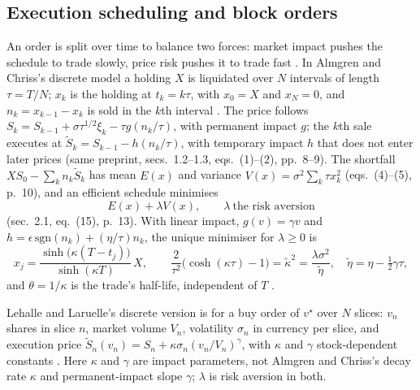\subsection{Execution scheduling and block orders}

\begin{qfmodel}\label{mod:almgren-chriss-execution}
 An order is split over time to balance two forces: market impact pushes the schedule to trade slowly, price risk pushes it to trade fast \citep[app.~A, sec.~A.7, p.~274]{alpha-laruelle}. In Almgren and Chriss's discrete model a holding $X$ is liquidated over $N$ intervals of length $\tau=T/N$; $x_k$ is the holding at $t_k=k\tau$, with $x_0=X$ and $x_N=0$, and $n_k=x_{k-1}-x_k$ is sold in the $k$th interval \citep[author preprint of Dec.\ 2000, sec.~1.1, p.~7]{alpha-almgren}. The price follows $S_k=S_{k-1}+\sigma\tau^{1/2}\xi_k-\tau g(n_k/\tau)$, with permanent impact $g$; the $k$th sale executes at $\tilde S_k=S_{k-1}-h(n_k/\tau)$, with temporary impact $h$ that does not enter later prices (same preprint, secs.~1.2--1.3, eqs.~(1)--(2), pp.~8--9). The shortfall $XS_0-\sum_kn_k\tilde S_k$ has mean $E(x)$ and variance $V(x)=\sigma^2\sum_k\tau x_k^2$ (eqs.~(4)--(5), p.~10), and an efficient schedule minimises
\[ E(x)+\lambda V(x),\qquad \lambda\ \text{the risk aversion} \]
(sec.~2.1, eq.~(15), p.~13). With linear impact, $g(v)=\gamma v$ and $h=\epsilon\,\mathrm{sgn}(n_k)+(\eta/\tau)n_k$, the unique minimiser for $\lambda\ge0$ is
\[ x_j=\frac{\sinh\bigl(\kappa(T-t_j)\bigr)}{\sinh(\kappa T)}\,X,\qquad \frac2{\tau^2}\bigl(\cosh(\kappa\tau)-1\bigr)=\tilde\kappa^2=\frac{\lambda\sigma^2}{\tilde\eta},\quad\tilde\eta=\eta-\tfrac12\gamma\tau, \]
and $\theta=1/\kappa$ is the trade's half-life, independent of $T$ \citep[same preprint, secs.~2.2--2.3, eqs.~(16)--(17), pp.~13--15]{alpha-almgren}.

 Lehalle and Laruelle's discrete version is for a buy order of $v^\star$ over $N$ slices: $v_n$ shares in slice $n$, market volume $V_n$, volatility $\sigma_n$ in currency per slice, and execution price $\tilde S_n(v_n)=S_n+\kappa\sigma_n(v_n/V_n)^{\gamma}$, with $\kappa$ and $\gamma$ stock-dependent constants \citep[app.~A, sec.~A.7.1, eqs.~(A.16)--(A.19), pp.~275--276]{alpha-laruelle}. Here $\kappa$ and $\gamma$ are impact parameters, not Almgren and Chriss's decay rate $\kappa$ and permanent-impact slope $\gamma$; $\lambda$ is risk aversion in both.


\end{qfmodel}

